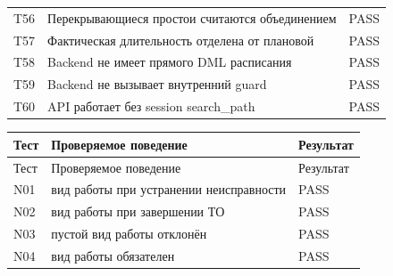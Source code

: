 \begin{singlespace}
\begin{longtable}{>{\raggedright\arraybackslash}p{}>{\raggedright\arraybackslash}p{}>{\raggedright\arraybackslash}p{}}
T56 & Перекрывающиеся простои считаются объединением & PASS \\
T57 & Фактическая длительность отделена от плановой & PASS \\
T58 & Backend не имеет прямого DML расписания & PASS \\
T59 & Backend не вызывает внутренний guard & PASS \\
T60 & API работает без session search\_\allowbreak{}path & PASS \\
\bottomrule\end{longtable}\end{singlespace}
\begin{singlespace}\small
\begin{longtable}{>{\raggedright\arraybackslash}p{}>{\raggedright\arraybackslash}p{}>{\raggedright\arraybackslash}p{}}
\toprule Тест & Проверяемое поведение & Результат\\\midrule\endfirsthead
\toprule Тест & Проверяемое поведение & Результат\\\midrule\endhead
N01 & вид работы при устранении неисправности & PASS \\
N02 & вид работы при завершении ТО & PASS \\
N03 & пустой вид работы отклонён & PASS \\
N04 & вид работы обязателен & PASS \\
\bottomrule\end{longtable}\end{singlespace}